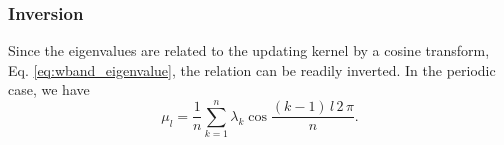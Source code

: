\documentclass[reprint, superscriptaddress, floatfix]{revtex4-1}
\begin{document}



\subsubsection{\label{sec:invert_wband}
Inversion}



Since the eigenvalues are related to the updating kernel
by a cosine transform,
Eq. \eqref{eq:wband_eigenvalue},
the relation can be readily inverted.
%
In the periodic case,
we have
%
\begin{equation}
  \mu_l
  =
  \frac 1 n
  \sum_{ k = 1 }^n
  \lambda_k
  \cos \frac{ (k - 1) \, l \, 2 \, \pi }
            {            n             }
  .
\label{eq:mu_from_lambda_pbc}
\end{equation}
\end{document}
